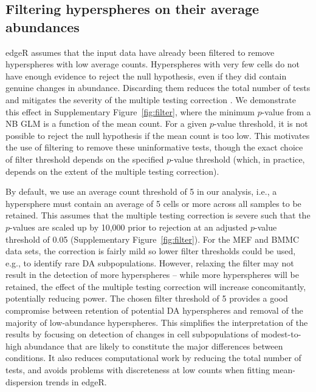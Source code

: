 \documentclass{article}
\begin{document}
\subsection{Filtering hyperspheres on their average abundances}
edgeR assumes that the input data have already been filtered to remove hyperspheres with low average counts.
Hyperspheres with very few cells do not have enough evidence to reject the null hypothesis, even if they did contain genuine changes in abundance.
Discarding them reduces the total number of tests and mitigates the severity of the multiple testing correction \cite{bourgon2010independent}.
We demonstrate this effect in Supplementary Figure~\ref{fig:filter}, where the minimum $p$-value from a NB GLM is a function of the mean count.
For a given $p$-value threshold, it is not possible to reject the null hypothesis if the mean count is too low.
This motivates the use of filtering to remove these uninformative tests, though the exact choice of filter threshold depends on the specified $p$-value threshold (which, in practice, depends on the extent of the multiple testing correction).

By default, we use an average count threshold of 5 in our analysis, i.e., a hypersphere must contain an average of 5 cells or more across all samples to be retained.
This assumes that the multiple testing correction is severe such that the $p$-values are scaled up by 10,000 prior to rejection at an adjusted $p$-value threshold of 0.05 (Supplementary Figure~\ref{fig:filter}). 
For the MEF and BMMC data sets, the correction is fairly mild so lower filter thresholds could be used, e.g., to identify rare DA subpopulations.
However, relaxing the filter may not result in the detection of more hyperspheres -- while more hyperspheres will be retained, the effect of the multiple testing correction will increase concomitantly, potentially reducing power.
The chosen filter threshold of 5 provides a good compromise between retention of potential DA hyperspheres and removal of the majority of low-abundance hyperspheres.
This simplifies the interpretation of the results by focusing on detection of changes in cell subpopulations of modest-to-high abundance that are likely to constitute the major differences between conditions.
It also reduces computational work by reducing the total number of tests, and avoids problems with discreteness at low counts when fitting mean-dispersion trends in edgeR.
\end{document}
